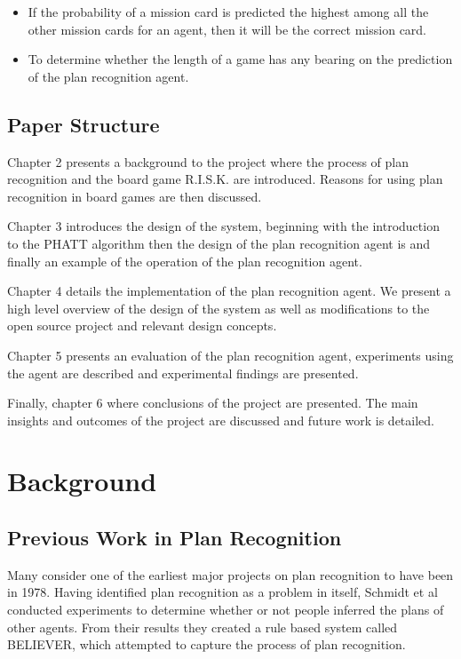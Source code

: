 \documentclass[parskip]{cs4rep}
\begin{document}
\begin{itemize}
\item
If the probability of a mission card is predicted the highest among all the other mission cards for an agent, then it will be the correct mission card.
\item
To determine whether the length of a game has any bearing on the prediction of the plan recognition agent.
\end{itemize}

\section{Paper Structure}

Chapter 2 presents a background to the project where the process of plan recognition and the board game R.I.S.K. are introduced. Reasons for using plan recognition in board games are then discussed.

Chapter 3 introduces the design of the system, beginning with the introduction to the PHATT algorithm then the design of the plan recognition agent is and finally an example of the operation of the plan recognition agent. 

Chapter 4 details the implementation of the plan recognition agent. We present a high level overview of the design of the system as well as modifications to the open source project and relevant design concepts. 

Chapter 5 presents an evaluation of the plan recognition agent, experiments using the agent are described and experimental findings are presented.

Finally, chapter 6 where conclusions of the project are presented. The main insights and outcomes of the project are discussed and future work is detailed.

\chapter{Background}

\section{Previous Work in Plan Recognition}

Many consider one of the earliest major projects on plan recognition to have been in 1978. Having identified plan recognition as a problem in itself, Schmidt et al \cite{journals/ai/SchmidtSG78} conducted experiments to determine whether or not people inferred the plans of other agents. From their results they created a rule based system called BELIEVER, which attempted to capture the process of plan recognition. 
\end{document}
